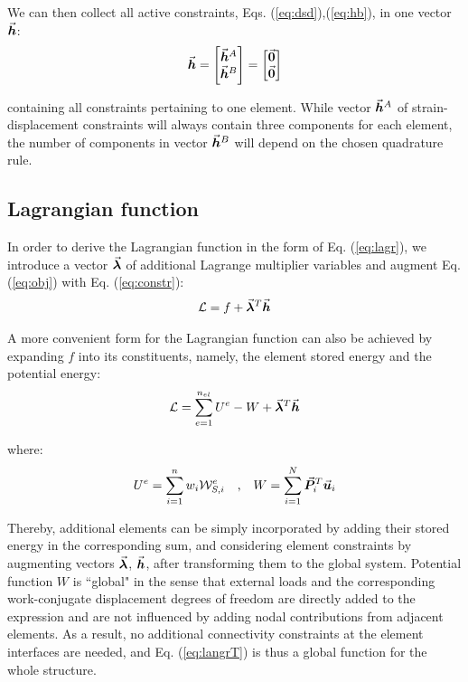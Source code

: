 \noindent We can then collect all active constraints, Eqs.
(\ref{eq:dsd}),(\ref{eq:hb}), in one vector $\vec{\boldsymbol{h}}$:
\begin{equation}
	\vec{\boldsymbol{h}} = \begin{bmatrix}
		\vec{\boldsymbol{h}}^A \\
		\vec{\boldsymbol{h}}^B
	\end{bmatrix} = \begin{bmatrix}
		\vec{\boldsymbol{0}}\\
		\vec{\boldsymbol{0}}
	\end{bmatrix}
	\label{eq:constr}
\end{equation}

\noindent containing all constraints pertaining to one element.
While vector $\vec{\boldsymbol{h}}^A$ of strain-displacement constraints
will always contain three components for each element, the number of components 
in vector
$\vec{\boldsymbol{h}}^B$ will depend on the chosen quadrature rule.

\subsection{Lagrangian function}\label{subsection:CH2-S3SS4}

In order to derive the Lagrangian function in the form of Eq. (\ref{eq:lagr}),
we introduce a vector $\vec{\boldsymbol{\lambda}}$ of additional Lagrange multiplier
variables and augment Eq. (\ref{eq:obj}) with Eq. (\ref{eq:constr}):  %
\begin{gather}
	\mathcal{L} = f + \vec{\boldsymbol{\lambda}}^T\vec{\boldsymbol{h}}
	\label{eq:elangr}
\end{gather}

\noindent A more convenient form for the Lagrangian function can also be
achieved by expanding $f$ into its constituents, namely, the element stored
energy and the potential energy:
\begin{gather}
	\mathcal{L} = \sum_{e=1}^{n_{el}}U^e - W +
	\vec{\boldsymbol{\lambda}}^T\vec{\boldsymbol{h}}
	\label{eq:langrT}
\end{gather}

\noindent where:
\begin{gather}
	U^e = \sum_{i=1}^n w_i\mathcal{W}_{S,i}^e \quad \text{,}\quad W = 
	\sum_{i=1}^N
	\vec{\boldsymbol{P}}_i^T\vec{\boldsymbol{u}}_i\nonumber
\end{gather}

\noindent Thereby, additional elements can be simply incorporated by adding
their stored energy in the corresponding sum, and considering element
constraints by augmenting vectors $\vec{\boldsymbol{\lambda}}$, $\vec{\boldsymbol{h}}$, after 
transforming
them to the global system. Potential function $W$ is ``global" in the
sense that external loads and the corresponding work-conjugate displacement
degrees of freedom are directly added to the expression and are not
influenced by adding nodal contributions from adjacent elements. As a result,
no additional connectivity constraints at the element interfaces are needed,
and Eq. (\ref{eq:langrT}) is thus a global function for the
whole structure.



